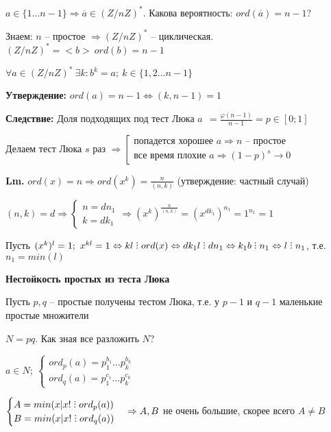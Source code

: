 \documentclass[14pt, letter paper]{article}
\def\divby{%
  \mathrel{\text{\vbox{\baselineskip.65ex\lineskiplimit0pt\hbox{.}\hbox{.}\hbox{.}}}}%
}
\begin{document}
$a \in \{1 \ldots n-1\} \Rightarrow \overline{a} \in (Z/nZ)^*$. Какова вероятность: $ord(\overline{a}) = n - 1$?

\vspace{5mm}

Знаем: $n$ -- простое $\Rightarrow (Z/nZ)^*$ -- циклическая. $(Z/nZ)^* = <b>\ ord(b) = n - 1$

$\forall a \in (Z/nZ)^*\ \exists k : b^k = a;\ k \in \{1, 2 \ldots n-1\}$

\textbf{Утверждение:} $ord(a) = n - 1 \Leftrightarrow (k, n-1) = 1$

\textbf{Следствие:} Доля подходящих под тест Люка $a\ \ = \frac{\varphi(n-1)}{n-1} = p \in [0; 1]$

Делаем тест Люка $s$ раз $\Rightarrow \left[ \begin{gathered}
    \text{попадется хорошее } a \Rightarrow n \text{ -- простое} \\
    \text{все время плохие } a \Rightarrow (1-p)^s \rightarrow 0
\end{gathered} \right.$

\textbf{Lm.} $ord(x) = n \Rightarrow ord(x^k) = \frac{n}{(n, k)}$ (утверждение: частный случай)

$(n, k) = d \Rightarrow \begin{cases}
    n = dn_1 \\
    k = dk_1
\end{cases} \Rightarrow (x^k)^\frac{n}{(n,k)} = (x^{dk_1})^{n_1} = 1^{n_1} = 1$

Пусть $(x^k)^l = 1;\ x^{kl} = 1 \Leftrightarrow kl \divby ord(x) \Leftrightarrow dk_1l \divby dn_1 \Leftrightarrow k_1b \divby n_1 \Leftrightarrow l \divby n_1$, т.е. $n_1 = min(l)$

\vspace{5mm}

\textbf{Нестойкость простых из теста Люка}

Пусть $p, q$ -- простые получены тестом Люка, т.е. у $p - 1$ и $q - 1$ маленькие простые множители

$N = pq$. Как зная все разложить $N$?

$a \in N;\ \begin{cases}
    ord_p(a) = p_1^{b_1}\ldots p_k^{b_k} \\
    ord_q(a) = p_1^{c_1}\ldots p_k^{c_k}
\end{cases}$

$\begin{cases}
    A = min(x | x! \divby ord_p(a)) \\
    B = min(x | x! \divby ord_q(a))
\end{cases} \Rightarrow A, B$ не очень большие, скорее всего $A \neq B$
\end{document}
